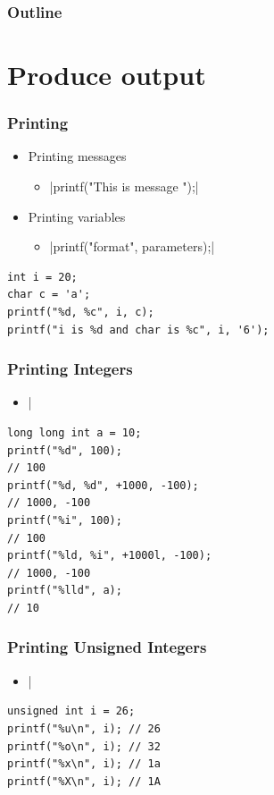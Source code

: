\documentclass{../c-lecture}
\subtitle{Interaction}
\begin{document}
\begin{frame}
  \titlepage{}
\end{frame}
\begin{frame}
  \frametitle{Outline}
  \tableofcontents{}
\end{frame}

\section{Produce output}

\begin{frame}[fragile]
  \frametitle{Printing}
  \begin{itemize}
    \item Printing messages
    \begin{itemize}
      \item {}|printf("This is message \n");|
    \end{itemize}
    \item Printing variables
    \begin{itemize}
      \item {}|printf("format", parameters);|
    \end{itemize}
  \end{itemize}
  \begin{verbatim}
int i = 20;
char c = 'a';
printf("%d, %c", i, c);
printf("i is %d and char is %c", i, '6');
  \end{verbatim}
\end{frame}

\begin{frame}[fragile]
  \frametitle{Printing Integers}
  \begin{itemize}
    \item {}|%
  \end{itemize}
  \begin{verbatim}
long long int a = 10;
printf("%d", 100);
// 100
printf("%d, %d", +1000, -100);
// 1000, -100
printf("%i", 100);
// 100
printf("%ld, %i", +1000l, -100);
// 1000, -100
printf("%lld", a);
// 10
  \end{verbatim}
\end{frame}

\begin{frame}[fragile]
  \frametitle{Printing Unsigned Integers}
  \begin{itemize}
    \item {}|%
  \end{itemize}
  \begin{verbatim}
unsigned int i = 26;
printf("%u\n", i); // 26
printf("%o\n", i); // 32
printf("%x\n", i); // 1a
printf("%X\n", i); // 1A
  \end{verbatim}
\end{frame}
\end{document}
